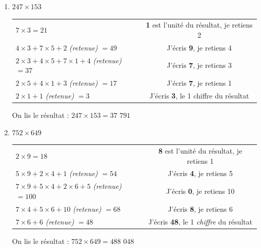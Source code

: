 \documentclass[a4paper]{article}
\begin{document}
\begin{small}
\begin{enumerate}

	\item $247 \times 153$

	\begin{tabular}{l|c}

		$7 \times 3 = 21$ & \textbf{1} est l'unité du résultat, je retiens 2
		
		\tabularnewline

		$4 \times 3 + 7 \times 5 + 2$ \textit{(retenue)} $= 49$ & J'écris \textbf{9}, je retiens 4

		\tabularnewline

		$2 \times 3 + 4 \times 5 + 7 \times 1 + 4$ \textit{(retenue)} $= 37$ & J'écris \textbf{7}, je retiens 3

		\tabularnewline

		$2 \times 5 + 4 \times 1 + 3$ \textit{(retenue)} $= 17$ & J'écris \textbf{7}, je retiens 1

		\tabularnewline

		$2 \times 1 + 1$ \textit{(retenue)} $= 3$ & J'écris \textbf{3}, le 1\up{er} chiffre du résultat
		
	\end{tabular}
	
	On lis le résultat : {\boldmath $247 \times 153 = 37$ $791$}\\





	\item $752 \times 649$

	\begin{tabular}{l|c}

		$2 \times 9 = 18$ & \textbf{8} est l'unité du résultat, je retiens 1
		
		\tabularnewline

		$5 \times 9 + 2 \times 4 + 1$ \textit{(retenue)} $= 54$ & J'écris \textbf{4}, je retiens 5

		\tabularnewline

		$7 \times 9 + 5 \times 4 + 2 \times 6 + 5$ \textit{(retenue)} $= 100$ & J'écris \textbf{0}, je retiens 10

		\tabularnewline

		$7 \times 4 + 5 \times 6 + 10$ \textit{(retenue)} $= 68$ & J'écris \textbf{8}, je retiens 6

		\tabularnewline

		$7 \times 6 + 6$ \textit{(retenue)} $= 48$ & J'écris \textbf{48}, le 1\up{er} \textit{chiffre} du résultat
		
	\end{tabular}
	
	On lis le résultat : {\boldmath $752 \times 649 = 488$ $048$}\\

\end{enumerate}
\end{small}
\end{document}

